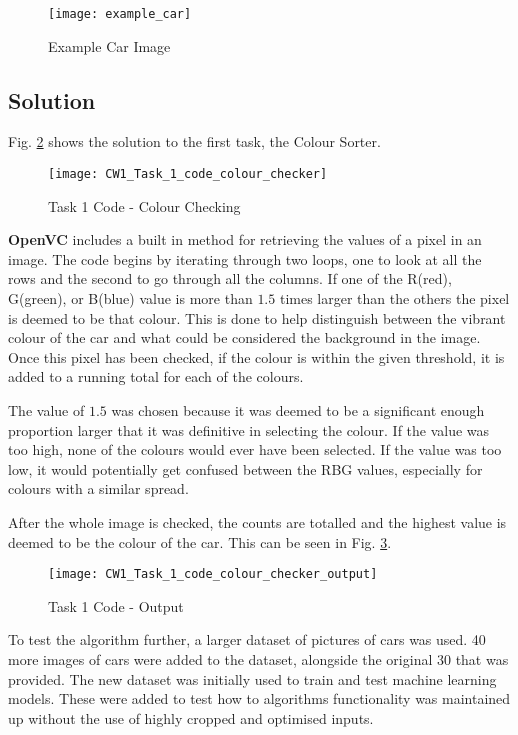 \documentclass[conference]{IEEEtran}
\begin{document}
\begin{figure}
\centerline{\texttt{[image: example\_car]}}
\caption{Example Car Image}
\label{fig:example_car}
\end{figure}

\subsection{Solution}
Fig. \ref{fig:CW1_Task_1_code_colour_checker} shows the solution to the first task, the Colour Sorter.

\begin{figure}
\centerline{\texttt{[image: CW1\_Task\_1\_code\_colour\_checker]}}
\caption{Task 1 Code - Colour Checking}
\label{fig:CW1_Task_1_code_colour_checker}
\end{figure}

\textbf{OpenVC} includes a built in method for retrieving the values of a pixel in an image. The code begins by iterating through two loops, one to look at all the rows and the second to go through all the columns. If one of the R(red), G(green), or B(blue) value is more than $1.5$ times larger than the others the pixel is deemed to be that colour. This is done to help distinguish between the vibrant colour of the car and what could be considered the background in the image. Once this pixel has been checked, if the colour is within the given threshold, it is added to a running total for each of the colours.

The value of $1.5$ was chosen because it was deemed to be a significant enough proportion larger that it was definitive in selecting the colour. If the value was too high, none of the colours would ever have been selected. If the value was too low, it would potentially get confused between the RBG values, especially for colours with a similar spread.

After the whole image is checked, the counts are totalled and the highest value is deemed to be the colour of the car. This can be seen in Fig. \ref{fig:CW1_Task_1_code_colour_checker_output}.

\begin{figure}
\centerline{\texttt{[image: CW1\_Task\_1\_code\_colour\_checker\_output]}}
\caption{Task 1 Code - Output}
\label{fig:CW1_Task_1_code_colour_checker_output}
\end{figure}

To test the algorithm further, a larger dataset of pictures of cars was used. 40 more images of cars were added to the dataset, alongside the original 30 that was provided. The new dataset was initially used to train and test machine learning models. \cite{ref:KrauseStarkDengFei-Fei_3DRR2013} These were added to test how to algorithms functionality was maintained up without the use of highly cropped and optimised inputs.
\end{document}
